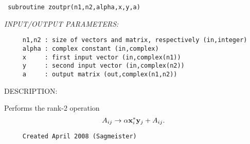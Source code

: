 \documentclass[11pt]{article}
\begin{document}
\begin{verbatim} subroutine zoutpr(n1,n2,alpha,x,y,a)\end{verbatim}{\em INPUT/OUTPUT PARAMETERS:}
\begin{verbatim}     n1,n2 : size of vectors and matrix, respectively (in,integer)
     alpha : complex constant (in,complex)
     x     : first input vector (in,complex(n1))
     y     : second input vector (in,complex(n2))
     a     : output matrix (out,complex(n1,n2))\end{verbatim}
{\sf DESCRIPTION:\\ }


     Performs the rank-2 operation
     $$ A_{ij}\rightarrow\alpha{\bf x}_i^*{\bf y}_j+A_{ij}. $$
  
\begin{verbatim}     Created April 2008 (Sagmeister)\end{verbatim}

\end{document}
